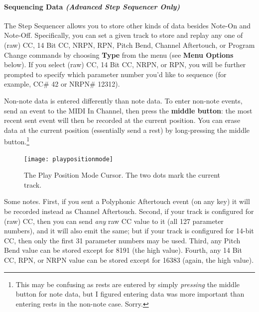\documentclass{article}
\begin{document}
\paragraph{Sequencing Data {\it (Advanced Step Sequencer Only)}} The Step Sequencer allows you to store other kinds of data besides Note-On and Note-Off.  Specifically, you can set a given track to store and replay any one of (raw) CC, 14 Bit CC, NRPN, RPN, Pitch Bend, Channel Aftertouch, or Program Change commands by choosing {\bf Type} from the menu (see {\bf Menu Options} below).  If you select (raw) CC, 14 Bit CC, NRPN, or RPN, you will be further prompted to specify which parameter number you'd like to sequence (for example, CC\# 42 or NRPN\# 12312).

Non-note data is entered differently than note data.  To enter non-note events, send an event to the MIDI In Channel, then press the {\bf middle button}: the most recent sent event will then be recorded at the current position.  You can erase data at the current position (essentially send a rest) by long-pressing the middle button.\footnote{This may be confusing as rests are entered by simply {\it pressing} the middle button for note data, but I figured entering data was more important than entering rests in the non-note case.  Sorry.}

\begin{figure}
\vspace{-1.5em}\hspace{\fill}\texttt{[image: playpositionmode]}\hspace{\fill}%
\vspace{-1em}
\caption{\small The Play Position Mode Cursor.  The two dots mark the current track.}
\vspace{-1em}
\label{playpositionmode}
\end{figure}

Some notes.  First, if you sent a Polyphonic Aftertouch event (on any key) it will be recorded instead as Channel Aftertouch.  Second, if your track is configured for (raw) CC, then you can send {\it any} raw CC value to it (all 127 parameter numbers), and it will also emit the same; but if your track is configured for 14-bit CC, then only the first 31 parameter numbers may be used.  Third, any Pitch Bend value can be stored except for 8191 (the high value).  Fourth, any 14 Bit CC, RPN, or NRPN value can be stored except for 16383 (again, the high value).  
\end{document}
